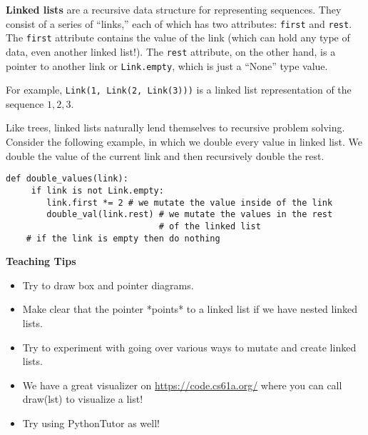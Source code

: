 \textbf{Linked lists} are a recursive data structure for representing sequences. They consist of a series of ``links,'' each of which has two attributes: \lstinline{first} and \lstinline{rest}. The \lstinline{first} attribute contains the value of the link (which can hold any type of data, even another linked list!). The \lstinline{rest} attribute, on the other hand, is a pointer to another link or \lstinline{Link.empty}, which is just a ``None'' type value. 

For example, \lstinline{Link(1, Link(2, Link(3)))} is a linked list representation of the sequence $1, 2, 3$. 

\begin{blocksection}
Like trees, linked lists naturally lend themselves to recursive problem solving. Consider the following example, in which we double every value in linked list. We double the value of the current link and then recursively double the rest. 
\begin{lstlisting}
def double_values(link): 
     if link is not Link.empty:
        link.first *= 2 # we mutate the value inside of the link
        double_val(link.rest) # we mutate the values in the rest 
                              # of the linked list
    # if the link is empty then do nothing
\end{lstlisting}
\end{blocksection}

\begin{guide}
    \textbf{Teaching Tips}
    \begin{itemize}
       \item Try to draw box and pointer diagrams.
       \item Make clear that the pointer *points* to a linked list if we have nested linked lists.
       \item Try to experiment with going over various ways to mutate and create linked lists. 
       \item We have a great visualizer on \url{https://code.cs61a.org/} where you can call draw(lst) to visualize a list! 
       \item Try using PythonTutor as well!
    \end{itemize}
 \end{guide}